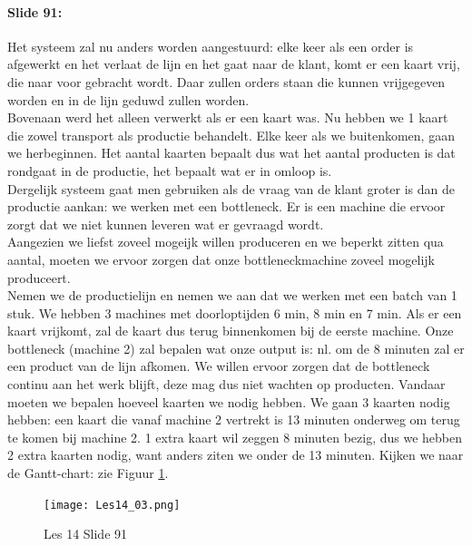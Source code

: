 \documentclass[10pt,a4paper]{report}
\begin{document}
\paragraph{Slide 91:} Het systeem zal nu anders worden aangestuurd: elke keer als een order is afgewerkt en het verlaat de lijn en het gaat naar de klant, komt er een kaart vrij, die naar voor gebracht wordt. Daar zullen orders staan die kunnen vrijgegeven worden en in de lijn geduwd zullen worden.\\
Bovenaan werd het alleen verwerkt als er een kaart was. Nu hebben we 1 kaart die zowel transport als productie behandelt. Elke keer als we buitenkomen, gaan we herbeginnen. Het aantal kaarten bepaalt dus wat het aantal producten is dat rondgaat in de productie, het bepaalt wat er in omloop is.\\
Dergelijk systeem gaat men gebruiken als de vraag van de klant groter is dan de productie aankan: we werken met een bottleneck. Er is een machine die ervoor zorgt dat we niet kunnen leveren wat er gevraagd wordt.\\
Aangezien we liefst zoveel mogeijk willen produceren en we beperkt zitten qua aantal, moeten we ervoor zorgen dat onze bottleneckmachine zoveel mogelijk produceert. \\
Nemen we de productielijn en nemen we aan dat we werken met een batch van 1 stuk. We hebben 3 machines met doorloptijden 6 min, 8 min en 7 min. Als er een kaart vrijkomt, zal de kaart dus terug binnenkomen bij de eerste machine. Onze bottleneck (machine 2) zal bepalen wat onze output is: nl. om de 8 minuten zal er een product van de lijn afkomen. We willen ervoor zorgen dat de bottleneck continu aan het werk blijft, deze mag dus niet wachten op producten. Vandaar moeten we bepalen hoeveel kaarten we nodig hebben. We gaan 3 kaarten nodig hebben: een kaart die vanaf machine 2 vertrekt is 13 minuten onderweg om terug te komen bij machine 2. 1 extra kaart wil zeggen 8 minuten bezig, dus we hebben 2 extra kaarten nodig, want anders ziten we onder de 13 minuten. Kijken we naar de Gantt-chart: zie Figuur \ref{les14_03}.\\

\begin{figure}[h!]
\centering
\texttt{[image: Les14\_03.png]}
\caption{Les 14 Slide 91} 
\label{les14_03}
\end{figure}
\end{document}
